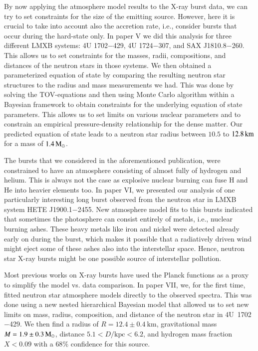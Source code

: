 By now applying the atmosphere model results to the X-ray burst data, we can try to set constraints for the size of the emitting source.
However, here it is crucial to take into account also the accretion rate, i.e., consider bursts that occur during the hard-state only.
In paper V we did this analysis for three different LMXB systems: 4U 1702$-$429, 4U 1724$-$307, and SAX J1810.8$-$260. 
This allows us to set constraints for the masses, radii, compositions, and distances of the neutron stars in those systems.
We then obtained a parameterized equation of state by comparing the resulting neutron star structures to the radius and mass measurements we had.
This was done by solving the TOV-equations and then using Monte Carlo algorithm within a Bayesian framework to obtain constraints for the underlying equation of state parameters.
This allows us to set limits on various nuclear parameters and to constrain an empirical pressure-density relationship for the dense matter. 
Our predicted equation of state leads to a neutron star radius between $10.5$ to $12.8\, \mathrm{km}$ for a mass of $1.4\, \mathrm{M}_{\odot}$.  


The bursts that we considered in the aforementioned publication, were constrained to have an atmosphere consisting of almost fully of hydrogen and helium.
This is always not the case as explosive nuclear burning can fuse H and He into heavier elements too.
In paper VI, we presented our analysis of one particularly interesting long burst observed from the neutron star in LMXB system HETE J1900.1$-$2455. 
New atmosphere model fits to this bursts indicated that sometimes the photosphere can consist entirely of metals, i.e., nuclear burning ashes.
These heavy metals like iron and nickel were detected already early on during the burst, which makes it possible that a radiatively driven wind might eject some of these ashes also into the interstellar space.
Hence, neutron star X-ray bursts might be one possible source of interstellar pollution.

Most previous works on X-ray bursts have used the Planck functions as a proxy to simplify the model vs. data comparison.
In paper VII, we, for the first time, fitted neutron star atmosphere models directly to the observed spectra.
This was done using a new nested hierarchical Bayesian model that allowed us to set new limits on mass, radius, composition, and distance of the neutron star in 4U~1702$-$429. 
We then find a radius of $R = 12.4\pm 0.4~\mathrm{km}$, gravitational mass $M=1.9\pm 0.3\, \mathrm{M}_{\odot}$, distance $5.1 < D/\mathrm{kpc} < 6.2$, and hydrogen mass fraction $X < 0.09$ with a $68\%$ confidence for this source.




